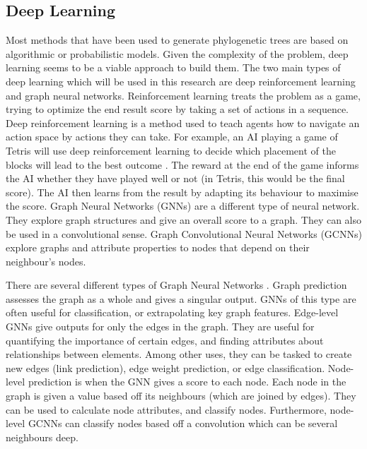 \documentclass{mpaper}
\begin{document}
\subsection{Deep Learning}

Most methods that have been used to generate phylogenetic trees are based on algorithmic or probabilistic models. Given the complexity of the problem, deep learning seems to be a viable approach to build them. The two main types of deep learning which will be used in this research are deep reinforcement learning and graph neural networks. Reinforcement learning treats the problem as a game, trying to optimize the end result score by taking a set of actions in a sequence. Deep reinforcement learning is a method used to teach agents how to navigate an action space by actions they can take. For example, an AI playing a game of Tetris will use deep reinforcement learning to decide which placement of the blocks will lead to the best outcome \cite{stevens2016playing}. The reward at the end of the game informs the AI whether they have played well or not (in Tetris, this would be the final score). The AI then learns from the result by adapting its behaviour to maximise the score. Graph Neural Networks (GNNs) are a different type of neural network. They explore graph structures and give an overall score to a graph. They can also be used in a convolutional sense. Graph Convolutional Neural Networks (GCNNs) explore graphs and attribute properties to nodes that depend on their neighbour's nodes. 

There are several different types of Graph Neural Networks \cite{Sanchez2021}. Graph prediction assesses the graph as a whole and gives a singular output. GNNs of this type are often useful for classification, or extrapolating key graph features. Edge-level GNNs give outputs for only the edges in the graph. They are useful for quantifying the importance of certain edges, and finding attributes about relationships between elements. Among other uses, they can be tasked to create new edges (link prediction), edge weight prediction, or edge classification. Node-level prediction is when the GNN gives a score to each node. Each node in the graph is given a value based off its neighbours (which are joined by edges). They can be used to calculate node attributes, and classify nodes. Furthermore, node-level GCNNs can classify nodes based off a convolution which can be several neighbours deep.

\vspace{3cm}
\end{document}
